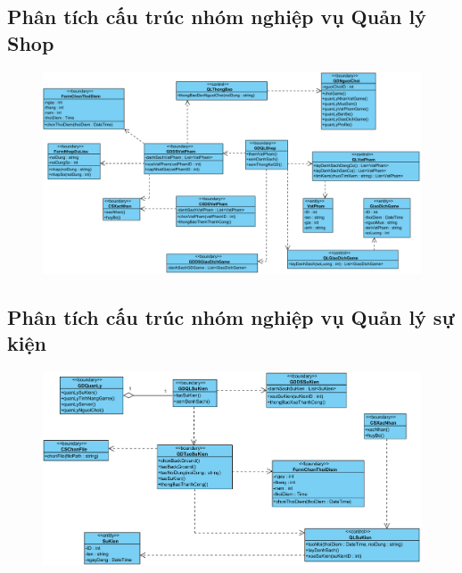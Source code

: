 \documentclass[3p]{elsarticle}
\begin{document}
\subsection{Phân tích cấu trúc nhóm nghiệp vụ Quản lý Shop}
\begin{figure}[!htbp]
	\hspace*{-.5in}
	\centering
	\includegraphics[scale=.55]{images/structure-pdfs/admin/qlShop.pdf}
\end{figure}
\newpage

\subsection{Phân tích cấu trúc nhóm nghiệp vụ Quản lý sự kiện}
\begin{figure}[!htbp]
	\hspace*{-.5in}
	\centering
	\includegraphics[scale=.55]{images/structure-pdfs/admin/qlSuKien.pdf}
\end{figure}
\newpage
\end{document}
